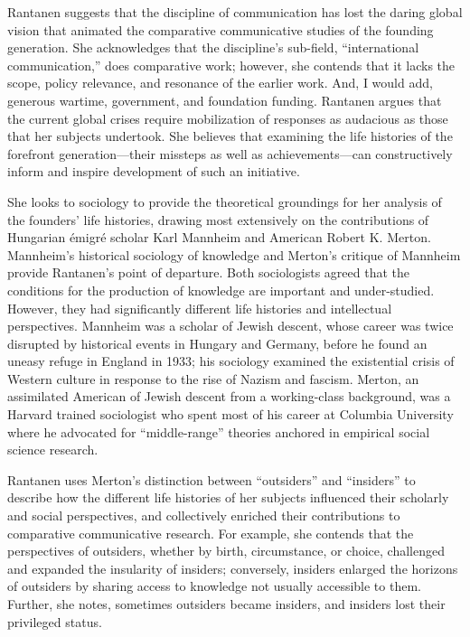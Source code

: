 \documentclass{tufte-handout}
\begin{document}
Rantanen suggests that the discipline of communication has lost the
daring global vision that animated the comparative communicative studies
of the founding generation. She acknowledges that the discipline's
sub-field, ``international communication,'' does comparative work;
however, she contends that it lacks the scope, policy relevance, and
resonance of the earlier work. And, I would add, generous wartime,
government, and foundation funding. Rantanen argues that the current
global crises require mobilization of responses as audacious as those
that her subjects undertook. She believes that examining the life
histories of the forefront generation---their missteps as well as
achievements---can constructively inform and inspire development of such
an initiative.

She looks to sociology to provide the theoretical groundings for her
analysis of the founders' life histories, drawing most extensively on
the contributions of Hungarian émigré scholar Karl Mannheim and American
Robert K. Merton. Mannheim's historical sociology of knowledge and
Merton's critique of Mannheim provide Rantanen's point of departure.
Both sociologists agreed that the conditions for the production of
knowledge are important and under-studied. However, they had
significantly different life histories and intellectual perspectives.
Mannheim was a scholar of Jewish descent, whose career was twice
disrupted by historical events in Hungary and Germany, before he found
an uneasy refuge in England in 1933; his sociology examined the
existential crisis of Western culture in response to the rise of Nazism
and fascism. Merton, an assimilated American of Jewish descent from a
working-class background, was a Harvard trained sociologist who spent
most of his career at Columbia University where he advocated for
``middle-range'' theories anchored in empirical social science research.

Rantanen uses Merton's distinction between ``outsiders'' and
``insiders'' to describe how the different life histories of her
subjects influenced their scholarly and social perspectives, and
collectively enriched their contributions to comparative communicative
research. For example, she contends that the perspectives of outsiders,
whether by birth, circumstance, or choice, challenged and expanded the
insularity of insiders; conversely, insiders enlarged the horizons of
outsiders by sharing access to knowledge not usually accessible to them.
Further, she notes, sometimes outsiders became insiders, and insiders
lost their privileged status.
\end{document}
